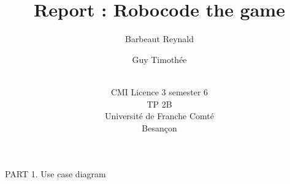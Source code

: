 \documentclass[12pt,a4paper]{article}
\title{Report : Robocode the game}
\author{Barbeaut Reynald \and Guy Timothée \and \\CMI Licence 3 semester 6\\TP 2B \\ Université de Franche Comté \\ Besançon}
\begin{document}
\maketitle

\newpage

{\LARGE PART 1. Use case diagram\\}
\end{document}
